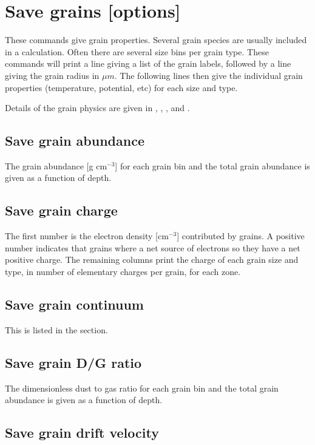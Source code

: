 \section{Save grains [options]}

These commands give grain properties.  Several grain species are usually
included in a calculation.   Often there are several size bins per grain
type.  These commands will print a line giving a list of the grain labels,
followed by a line giving the grain radius in $\mu m$.
The following lines then give the individual grain properties
(temperature, potential, etc) for each size and type.

Details of the grain physics are given in \citet{Baldwin1991},
\citet{Weingartner2001a},
\citet{VanHoof2004}, and \citet{Weingartner2006}.

\subsection{Save grain abundance}

The grain abundance [g cm$^{-3}$] for each grain bin and the total grain
abundance is given as a function of depth.

\subsection{Save grain charge}

The first number is the electron density [cm$^{-3}$] contributed by grains.
A positive number indicates that grains where a net source of electrons
so they have a net positive charge.  The remaining columns print the charge
of each grain size and type, in number of elementary charges per grain,
for each zone.

\subsection{Save grain continuum}

This is listed in the  section.

\subsection{Save grain D/G ratio}

The dimensionless dust to gas ratio for each grain bin and the total
grain abundance is given as a function of depth.

\subsection{Save grain drift velocity}

